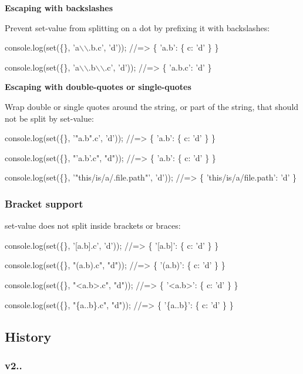 {\bfseries Escaping with backslashes}

Prevent set-\/value from splitting on a dot by prefixing it with backslashes\+:


\begin{DoxyCode}
console.log(set(\{\}, 'a\(\backslash\)\(\backslash\).b.c', 'd'));
//=> \{ 'a.b': \{ c: 'd' \} \}

console.log(set(\{\}, 'a\(\backslash\)\(\backslash\).b\(\backslash\)\(\backslash\).c', 'd'));
//=> \{ 'a.b.c': 'd' \}
\end{DoxyCode}


{\bfseries Escaping with double-\/quotes or single-\/quotes}

Wrap double or single quotes around the string, or part of the string, that should not be split by set-\/value\+:


\begin{DoxyCode}
console.log(set(\{\}, '"a.b".c', 'd'));
//=> \{ 'a.b': \{ c: 'd' \} \}

console.log(set(\{\}, "'a.b'.c", "d"));
//=> \{ 'a.b': \{ c: 'd' \} \}

console.log(set(\{\}, '"this/is/a/.file.path"', 'd'));
//=> \{ 'this/is/a/file.path': 'd' \}
\end{DoxyCode}


\subsubsection*{Bracket support}

set-\/value does not split inside brackets or braces\+:


\begin{DoxyCode}
console.log(set(\{\}, '[a.b].c', 'd'));
//=> \{ '[a.b]': \{ c: 'd' \} \}

console.log(set(\{\}, "(a.b).c", "d"));
//=> \{ '(a.b)': \{ c: 'd' \} \}

console.log(set(\{\}, "<a.b>.c", "d"));
//=> \{ '<a.b>': \{ c: 'd' \} \}

console.log(set(\{\}, "\{a..b\}.c", "d"));
//=> \{ '\{a..b\}': \{ c: 'd' \} \}
\end{DoxyCode}


\subsection*{History}

\subsubsection*{v2..}


